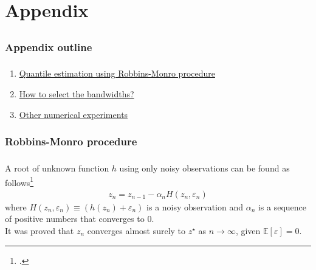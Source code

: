 \documentclass[aspectratio=169]{beamer}
\begin{document}
\section{}
	\begin{frame}
		~\\[-1em]
		\printbibliography
	\end{frame}
\section{}
	
\section{Appendix}
	\subsection{}
	
		\subsubsection{Appendix outline}
			\begin{frame}
				\frametitle{\insertsubsubsection}
				
				\begin{enumerate}
					\item \hyperlink{robMonro}{\color{blue}Quantile estimation using Robbins-Monro procedure}
					\item \hyperlink{bandwidth}{\color{blue}How to select the bandwidths?}
					\item \hyperlink{numResults}{\color{blue} Other numerical experiments}
				\end{enumerate}
				
			\end{frame}
	
		\subsubsection{Robbins-Monro procedure}\label{robMonro}
			\begin{frame}[label={important}]
				\frametitle{\insertsubsubsection}
				
				 A root of unknown function $ h $ using only noisy observations can be found as follows\footcite{Robbins1951}
				\begin{align}
				z_n = z_{n-1} - \alpha_n H(z_n, \varepsilon_n)
				\end{align}
				where $ H(z_n, \varepsilon_n) \equiv (h(z_n) + \varepsilon_n) $ is a noisy observation and $ \alpha_n $ is a sequence of positive numbers that converges to 0. \\[1em]
				
				\onslide<2-> It was proved that $ z_n $ converges almost surely to $ z^\star $ as $ n\rightarrow \infty $, given $ \mathbb{E}[\varepsilon]=0 $.
				
			\end{frame}
			
\end{document}
